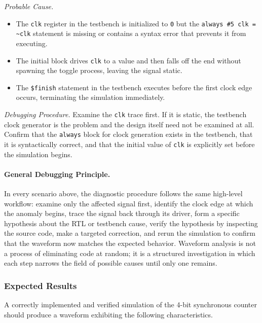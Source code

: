 \textit{Probable Cause.}
\begin{itemize}
    \item The \texttt{clk} register in the testbench is initialized to
          \texttt{0} but the \texttt{always \#5 clk = \textasciitilde{}clk}
          statement is missing or contains a syntax error that prevents it
          from executing.
    \item The initial block drives \texttt{clk} to a value and then falls
          off the end without spawning the toggle process, leaving the signal
          static.
    \item The \texttt{\$finish} statement in the testbench executes before
          the first clock edge occurs, terminating the simulation immediately.
\end{itemize}

\textit{Debugging Procedure.} Examine the \texttt{clk} trace first. If
it is static, the testbench clock generator is the problem and the design
itself need not be examined at all. Confirm that the \texttt{always}
block for clock generation exists in the testbench, that it is syntactically
correct, and that the initial value of \texttt{clk} is explicitly set before
the simulation begins.\\

\paragraph{General Debugging Principle.}
In every scenario above, the diagnostic procedure follows the same
high-level workflow: examine only the affected signal first, identify the
clock edge at which the anomaly begins, trace the signal back through its
driver, form a specific hypothesis about the RTL or testbench cause, verify
the hypothesis by inspecting the source code, make a targeted correction,
and rerun the simulation to confirm that the waveform now matches the
expected behavior. Waveform analysis is not a process of eliminating code
at random; it is a structured investigation in which each step narrows the
field of possible causes until only one remains.

\subsubsection{Expected Results}
\label{sec:sim-lab-expected}

A correctly implemented and verified simulation of the 4-bit synchronous
counter should produce a waveform exhibiting the following characteristics.

